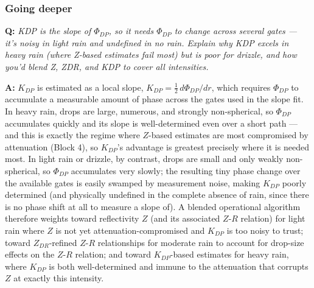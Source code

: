 \documentclass[11pt]{article}
\newenvironment{qa}[1]{\par\noindent\textbf{\color{qgray}Q: }\emph{#1}\par\noindent\textbf{A: }}{\par\vspace{6pt}}
\newcommand{\tier}[1]{\subsubsection*{#1}}
\begin{document}
\tier{Going deeper}
\begin{qa}{KDP is the \emph{slope} of $\Phi_{DP}$, so it needs $\Phi_{DP}$ to change across several gates --- it's noisy in light rain and undefined in no rain. Explain why KDP excels in heavy rain (where Z-based estimates fail most) but is poor for drizzle, and how you'd blend Z, ZDR, and KDP to cover all intensities.}
$K_{DP}$ is estimated as a local slope, $K_{DP}=\tfrac12\,d\Phi_{DP}/dr$, which requires $\Phi_{DP}$ to accumulate a measurable amount of phase across the gates used in the slope fit. In heavy rain, drops are large, numerous, and strongly non-spherical, so $\Phi_{DP}$ accumulates quickly and its slope is well-determined even over a short path --- and this is exactly the regime where $Z$-based estimates are most compromised by attenuation (Block 4), so $K_{DP}$'s advantage is greatest precisely where it is needed most. In light rain or drizzle, by contrast, drops are small and only weakly non-spherical, so $\Phi_{DP}$ accumulates very slowly; the resulting tiny phase change over the available gates is easily swamped by measurement noise, making $K_{DP}$ poorly determined (and physically undefined in the complete absence of rain, since there is no phase shift at all to measure a slope of). A blended operational algorithm therefore weights toward reflectivity $Z$ (and its associated $Z$-$R$ relation) for light rain where $Z$ is not yet attenuation-compromised and $K_{DP}$ is too noisy to trust; toward $Z_{DR}$-refined $Z$-$R$ relationships for moderate rain to account for drop-size effects on the $Z$-$R$ relation; and toward $K_{DP}$-based estimates for heavy rain, where $K_{DP}$ is both well-determined and immune to the attenuation that corrupts $Z$ at exactly this intensity.
\end{qa}
\end{document}
